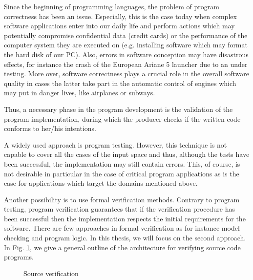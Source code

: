 
Since the beginning of programming languages, the problem of program correctness has been an issue. 
Especially, this is the case today when complex software applications  enter into our daily life and perform actions 
which may potentially compromise confidential data (credit cards) or the performance of the
 computer system they are executed on (e.g. installing software which may format the hard disk of our PC).
Also, errors in software conception may have disastrous effects, for instance
the crash of the European Ariane 5 launcher due to an under testing. More over, software correctness
 plays a crucial role in the overall software quality  in cases the latter take part in the automatic 
control of engines which may put in danger lives, like airplanes or subways.


Thus, a necessary phase in the program development is the validation of the program implementation, during which 
the producer checks if the written code conforms to her/his intentions. 


A widely used approach is program testing. However, this technique is not capable
to cover all the cases of the input space and thus, although the tests have been successful, 
the implementation may still contain errors. This, of course, is not desirable in particular in the case of critical 
program applications as is the case for applications which target the domains mentioned above.

 Another possibility is to use formal verification methods. 
Contrary to program testing,  program verification guarantees that if the verification procedure  
has been successful then the implementation respects the initial requirements for the software. There are few approaches 
in formal verification as for instance model checking and program logic. In this thesis, we will focus on the second approach.  
In Fig. \ref{intro:srcVerif}, we give a general outline of the architecture for verifying source code programs.
\begin{figure}[ht!]
\begin{center}
\caption{\sc Source verification}
\label{intro:srcVerif}
\end{center}
\end{figure}

